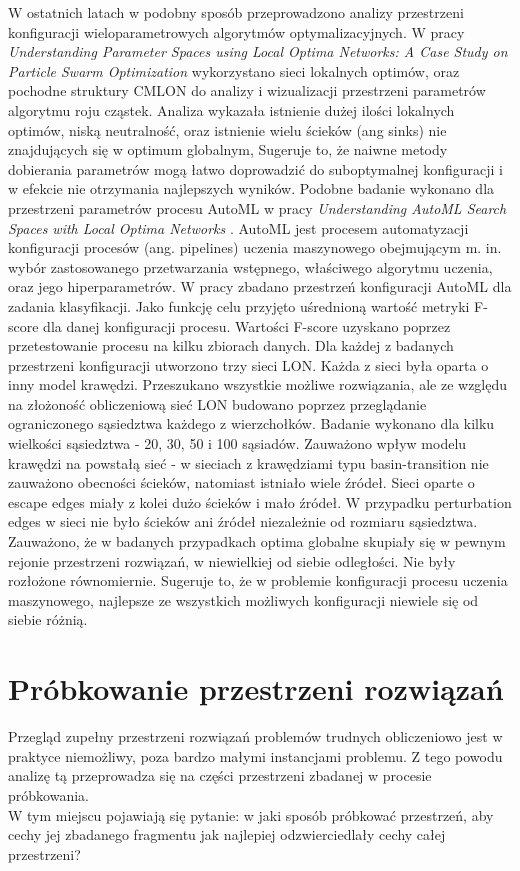 W ostatnich latach w podobny sposób przeprowadzono analizy przestrzeni konfiguracji wieloparametrowych algorytmów optymalizacyjnych.
W pracy \textit{Understanding Parameter Spaces using Local Optima Networks: A Case Study on Particle Swarm Optimization} \cite{DBLP:conf/gecco/CleghornO21}
wykorzystano sieci lokalnych optimów, oraz pochodne struktury CMLON do analizy i wizualizacji przestrzeni parametrów algorytmu roju cząstek.
Analiza wykazała istnienie dużej ilości lokalnych optimów, niską neutralność, oraz istnienie wielu ścieków (ang sinks) nie znajdujących się w optimum globalnym,
Sugeruje to, że naiwne metody dobierania parametrów mogą łatwo doprowadzić do suboptymalnej konfiguracji i w efekcie nie otrzymania najlepszych wyników.
Podobne badanie wykonano dla przestrzeni parametrów procesu AutoML w pracy \textit{Understanding AutoML Search Spaces with Local Optima Networks} \cite{DBLP:conf/gecco/TeixeiraP22}.
AutoML jest procesem automatyzacji konfiguracji procesów (ang. pipelines) uczenia maszynowego obejmującym m. in. wybór zastosowanego przetwarzania wstępnego,
właściwego algorytmu uczenia, oraz jego hiperparametrów. W pracy zbadano przestrzeń konfiguracji AutoML dla zadania klasyfikacji.
Jako funkcję celu przyjęto uśrednioną wartość metryki F-score dla danej konfiguracji procesu.
Wartości F-score uzyskano poprzez przetestowanie procesu na kilku zbiorach danych.
Dla każdej z badanych przestrzeni konfiguracji utworzono trzy sieci LON. Każda z sieci była oparta o inny model krawędzi.
Przeszukano wszystkie możliwe rozwiązania, ale ze względu na złożoność obliczeniową sieć LON budowano poprzez przeglądanie
ograniczonego sąsiedztwa każdego z wierzchołków. Badanie wykonano dla kilku wielkości sąsiedztwa - 20, 30, 50 i 100 sąsiadów.
Zauważono wpływ modelu krawędzi na powstałą sieć - w sieciach z krawędziami typu basin-transition nie zauważono obecności ścieków,
natomiast istniało wiele źródeł. Sieci oparte o escape edges miały z kolei dużo ścieków i mało źródeł.
W przypadku perturbation edges w sieci nie było ścieków ani źródeł niezależnie od rozmiaru sąsiedztwa.
Zauważono, że w badanych przypadkach optima globalne skupiały się w pewnym rejonie przestrzeni rozwiązań, w niewielkiej od siebie odległości.
Nie były rozłożone równomiernie. Sugeruje to, że w problemie konfiguracji procesu uczenia maszynowego, najlepsze ze wszystkich możliwych
konfiguracji niewiele się od siebie różnią.


\section{Próbkowanie przestrzeni rozwiązań}
Przegląd zupełny przestrzeni rozwiązań problemów trudnych obliczeniowo jest w praktyce niemożliwy, poza bardzo małymi instancjami problemu.
Z tego powodu analizę tą przeprowadza się na części przestrzeni zbadanej w procesie próbkowania. \\
W tym miejscu pojawiają się pytanie: w jaki sposób próbkować przestrzeń, aby cechy jej zbadanego fragmentu
jak najlepiej odzwierciedlały cechy całej przestrzeni?

